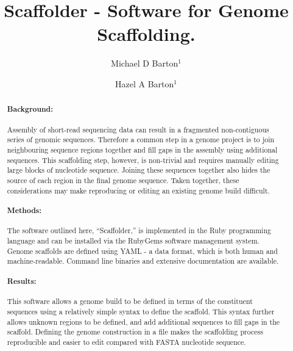 \documentclass[10pt]{bmc_article}
\newenvironment{bmcformat}{\begin{raggedright}\baselineskip20pt\sloppy\setboolean{publ}{false}}{\end{raggedright}\baselineskip20pt\sloppy}
\begin{document}
\begin{bmcformat}

\title{Scaffolder - Software for  Genome
Scaffolding.}

\author{
  Michael D Barton$^{1}$\correspondingauthor%
\and
  Hazel A Barton$^1$%
      }

\address{\iid(1) Department of Biological Sciences, Northern Kentucky %
University, Nunn Drive, Highland Heights, KY 41076 }%

\maketitle

\clearpage

\begin{abstract} %

  \paragraph*{Background:} Assembly of short-read sequencing data can result in
  a fragmented non-contiguous series of genomic sequences. Therefore a common
  step in a genome project is to join neighbouring sequence regions together
  and fill gaps in the assembly using additional sequences. This scaffolding
  step, however, is non-trivial and requires manually editing large blocks of
  nucleotide sequence. Joining these sequences together also hides the source
  of each region in the final genome sequence. Taken together, these
  considerations may make reproducing or editing an existing genome build
  difficult.

  \paragraph*{Methods:} The software outlined here, ``Scaffolder,'' is
  implemented in the Ruby programming language and can be installed via the
  RubyGems software management system. Genome scaffolds are defined using
  YAML - a data format, which is both human and machine-readable. Command line
  binaries and extensive documentation are available.

  \paragraph*{Results:} This software allows a genome build to be defined in
  terms of the constituent sequences using a relatively simple syntax to
  define the scaffold. This syntax further allows  unknown regions to be
  defined, and add additional sequences to fill gaps in the scaffold. Defining
  the genome construction in a file makes the scaffolding process reproducible
  and easier to edit compared with FASTA nucleotide sequence.


\end{abstract}
\end{bmcformat}
\end{document}

